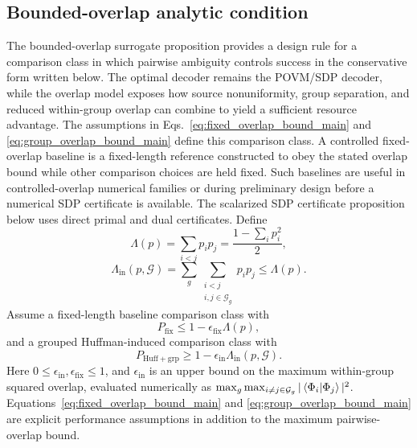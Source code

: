 \subsection*{Bounded-overlap analytic condition}

The bounded-overlap surrogate proposition provides a design rule for a comparison class in which pairwise ambiguity controls success in the conservative form written below. The optimal decoder remains the POVM/SDP decoder, while the overlap model exposes how source nonuniformity, group separation, and reduced within-group overlap can combine to yield a sufficient resource advantage.
The assumptions in Eqs.~\eqref{eq:fixed_overlap_bound_main} and \eqref{eq:group_overlap_bound_main} define this comparison class. A controlled fixed-overlap baseline is a fixed-length reference constructed to obey the stated overlap bound while other comparison choices are held fixed. Such baselines are useful in controlled-overlap numerical families or during preliminary design before a numerical SDP certificate is available. The scalarized SDP certificate proposition below uses direct primal and dual certificates.
Define
\begin{equation}
    \Lambda(p)=\sum_{i<j}p_ip_j=\frac{1-\sum_ip_i^2}{2},
\end{equation}
\begin{equation}
    \Lambda_{\mathrm{in}}(p,\mathcal G)=\sum_g\sum_{\substack{i<j\\ i,j\in\mathcal G_g}}p_ip_j\le \Lambda(p).
\end{equation}
Assume a fixed-length baseline comparison class with
\begin{equation}
    P_{\mathrm{fix}}\le 1-\epsilon_{\mathrm{fix}}\Lambda(p),
    \label{eq:fixed_overlap_bound_main}
\end{equation}
and a grouped Huffman-induced comparison class with
\begin{equation}
    P_{\mathrm{Huff+grp}}\ge 1-\epsilon_{\mathrm{in}}\Lambda_{\mathrm{in}}(p,\mathcal G).
    \label{eq:group_overlap_bound_main}
\end{equation}
Here \(0\leq\epsilon_{\mathrm{in}},\epsilon_{\mathrm{fix}}\leq1\), and $\epsilon_{\mathrm{in}}$ is an upper bound on the maximum within-group squared overlap, evaluated numerically as $\max_g\max_{i\ne j\in\mathcal G_g}|\braket{\Phi_i|\Phi_j}|^2$. Equations~\eqref{eq:fixed_overlap_bound_main} and \eqref{eq:group_overlap_bound_main} are explicit performance assumptions in addition to the maximum pairwise-overlap bound.

